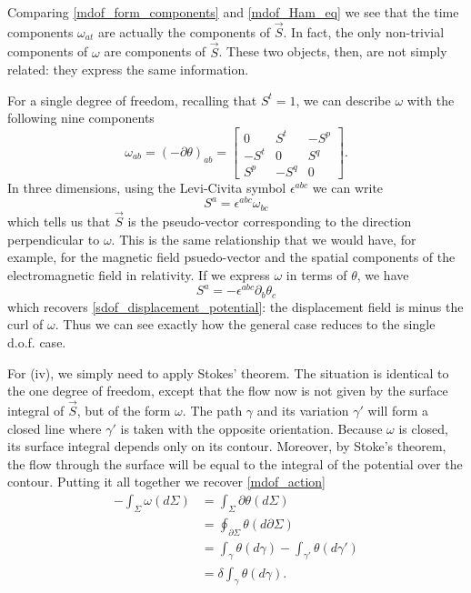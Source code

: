 \documentclass[10pt,twocolumn, nofootinbib]{revtex4-2}
\begin{document}
Comparing \ref{mdof_form_components} and \ref{mdof_Ham_eq} we see that the time components $\omega_{at}$ are actually the components of $\vec{S}$. In fact, the only non-trivial components of $\omega$ are components of $\vec{S}$. These two objects, then, are not simply related: they express the same information.

For a single degree of freedom, recalling that $S^t = 1$, we can describe $\omega$ with the following nine components
\begin{equation}\label{mdof_reduceto_sdof}
	\omega_{ab}=(-\partial\theta)_{ab} = \begin{bmatrix}
		0 & S^t & -S^p \\
		-S^t & 0 & S^q \\
		S^p & - S^q & 0
	\end{bmatrix}.
\end{equation}
In three dimensions, using the Levi-Civita symbol $\epsilon^{abc}$ we can write
\begin{equation}
	S^a = \epsilon^{abc} \omega_{bc}
\end{equation}
which tells us that $\vec{S}$ is the pseudo-vector corresponding to the direction perpendicular to $\omega$. This is the same relationship that we would have, for example, for the magnetic field psuedo-vector and the spatial components of the electromagnetic field in relativity. If we express $\omega$ in terms of $\theta$, we have
\begin{equation}
	S^a = - \epsilon^{abc} \partial_b \theta_c
\end{equation}
which recovers \ref{sdof_displacement_potential}: the displacement field is minus the curl of $\omega$. Thus we can see exactly how the general case reduces to the single d.o.f. case.

For (iv), we simply need to apply Stokes' theorem. The situation is identical to the one degree of freedom, except that the flow now is not given by the surface integral of $\vec{S}$, but of the form $\omega$. The path $\gamma$ and its variation $\gamma'$ will form a closed line where $\gamma'$ is taken with the opposite orientation. Because $\omega$ is closed, its surface integral depends only on its contour. Moreover, by Stoke's theorem, the flow through the surface will be equal to the integral of the potential over the contour. Putting it all together we recover \ref{mdof_action}
\begin{equation}
\begin{aligned}
	- \int_{\Sigma} \omega(d\Sigma) &=
	\int_{\Sigma} \partial \theta (d\Sigma) \\
	&= \oint_{\partial \Sigma} \theta(d\partial\Sigma) \\
	&= \int_{\gamma} \theta(d\gamma) - \int_{\gamma'} \theta (d\gamma') \\
	&= \delta \int_{\gamma} \theta (d\gamma).
\end{aligned}
\end{equation}
\end{document}
